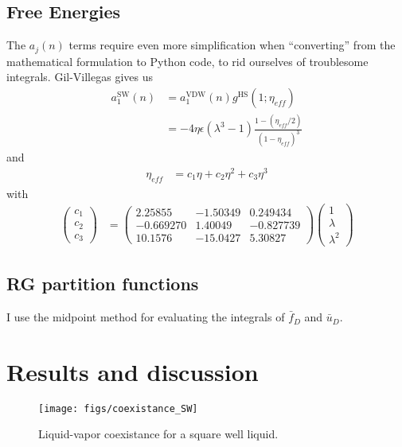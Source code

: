 \documentclass[letterpaper,twocolumn,amsmath,amssymb,prb]{revtex4-1}
\newcommand{\1}{\ensuremath{\textbf{r}_1}}
\newcommand{\2}{\ensuremath{\textbf{r}_2}}
\newcommand{\3}{\ensuremath{\textbf{r}_3}}
\newcommand{\4}{\ensuremath{\textbf{r}_4}}
\begin{document}
\subsection{Free Energies}\label{subsec:free-energies}
The $a_j(n)$ terms require even more simplification when
``converting'' from the mathematical formulation to Python code, to
rid ourselves of troublesome integrals. Gil-Villegas gives us
\newcommand\eff{\textit{eff}}
\begin{align}
  a_1^\text{SW}(n) &= a_1^\text{VDW}(n)g^\text{HS}(1;\eta_{\eff}) \\
  &= -4\eta\epsilon(\lambda^3 - 1)\frac{1 - \left( \eta_{\eff}/2 \right)}{(1 - \eta_{\eff})^3}
\end{align}
and
\begin{align}
  \eta_{\eff} &= c_1\eta + c_2\eta^2 + c_3\eta^3
\end{align}
with
\begin{align}
  \left( \begin{array}{c}
    c_1 \\
    c_2 \\
    c_3
    \end{array} \right)
  &= \left( \begin{array}{ccc}
    2.25855 & -1.50349 & 0.249434 \\
    -0.669270 & 1.40049 & -0.827739 \\
    10.1576 & -15.0427 & 5.30827
    \end{array} \right)
  \left( \begin{array}{c}
    1 \\
    \lambda \\
    \lambda^2
    \end{array} \right)
\end{align}

\subsection{RG partition functions}\label{subsec:fbar-ubar}
I use the midpoint method for evaluating the integrals of $\bar{f}_D$ and $\bar{u}_D$.

\section{Results and discussion}

\begin{figure}
  \begin{center}
  \texttt{[image: figs/coexistance\_SW]}
  \end{center}
  \caption{Liquid-vapor coexistance for a square well liquid.}
  \label{fig:coexistance_SW}
\end{figure}
\end{document}
